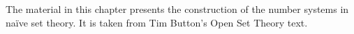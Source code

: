 \documentclass[../../../include/open-logic-section]{subfiles}
\begin{document}
	

\begin{editorial}
The material in this chapter presents the construction of the number
systems in na\"ive set theory. It is taken from Tim Button's Open Set
Theory text.
\end{editorial}








\OLEndChapterHook
\end{document}
